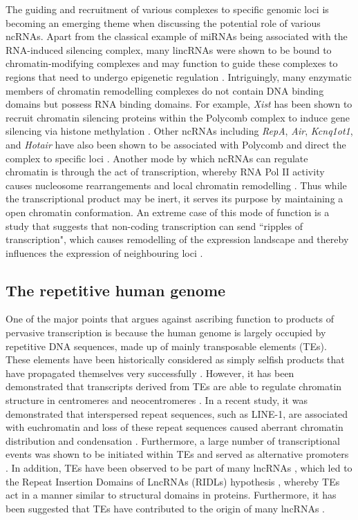 The guiding and recruitment of various complexes to specific genomic loci is becoming an emerging theme when discussing the potential role of various ncRNAs. Apart from the classical example of miRNAs being associated with the RNA-induced silencing complex, many lincRNAs were shown to be bound to chromatin-modifying complexes and may function to guide these complexes to regions that need to undergo epigenetic regulation \citep{pmid21915889,pmid19571010}. Intriguingly, many enzymatic members of chromatin remodelling complexes do not contain DNA binding domains but possess RNA binding domains. For example, \textit{Xist} has been shown to recruit chromatin silencing proteins within the Polycomb complex to induce gene silencing via histone methylation \citep{pmid17869504}. Other ncRNAs including \textit{RepA}, \textit{Air}, \textit{Kcnq1ot1}, and \textit{Hotair} have also been shown to be associated with Polycomb and direct the complex to specific loci \citep{pmid21915889}. Another mode by which ncRNAs can regulate chromatin is through the act of transcription, whereby RNA Pol II activity causes nucleosome rearrangements and local chromatin remodelling \citep{pmid16094312}. Thus while the transcriptional product may be inert, it serves its purpose by maintaining a open chromatin conformation. An extreme case of this mode of function is a study that suggests that non-coding transcription can send ``ripples of transcription", which causes remodelling of the expression landscape and thereby influences the expression of neighbouring loci \citep{pmid19160492}.

\subsection{The repetitive human genome}

One of the major points that argues against ascribing function to products of pervasive transcription is because the human genome is largely occupied by repetitive DNA sequences, made up of mainly transposable elements (TEs). These elements have been historically considered as simply selfish products that have propagated themselves very successfully \citep{doolittle1980selfish,orgel1980selfish}. However, it has been demonstrated that transcripts derived from TEs are able to regulate chromatin structure in centromeres and neocentromeres \citep{pmid19180186}. In a recent study, it was demonstrated that interspersed repeat sequences, such as LINE-1, are associated with euchromatin and loss of these repeat sequences caused aberrant chromatin distribution and condensation \citep{pmid24581492}. Furthermore, a large number of transcriptional events was shown to be initiated within TEs and served as alternative promoters \citep{pmid19377475}. In addition, TEs have been observed to be part of many lncRNAs \citep{pmid23181609}, which led to the Repeat Insertion Domains of LncRNAs (RIDLs) hypothesis \citep{pmid24850885}, whereby TEs act in a manner similar to structural domains in proteins. Furthermore, it has been suggested that TEs have contributed to the origin of many lncRNAs \citep{pmid23637635,pmid25218058}.

